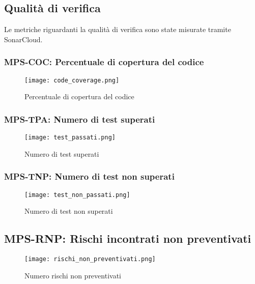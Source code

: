 \documentclass[../piano-di-qualifica.tex]{subfiles}
\begin{document}
\subsection{Qualità di verifica}%
\label{sub:qualita_verifica_report}
Le metriche riguardanti la qualità di verifica sono state misurate tramite SonarCloud.

\subsubsection{MPS-COC\@: Percentuale di copertura del codice}%
\label{subs:percentuale_cop_codice}
\begin{figure}[H]
  \centering
  \texttt{[image: code\_coverage.png]}%
  \caption{Percentuale di copertura del codice}%
  \label{fig:percentuale_cop_codice}%
\end{figure}

\subsubsection{MPS-TPA\@: Numero di test superati}%
\label{subs:test_non_superati}
\begin{figure}[H]
  \centering
  \texttt{[image: test\_passati.png]}%
  \caption{Numero di test superati}%
  \label{fig:test_non_superati}%
\end{figure}

\subsubsection{MPS-TNP\@: Numero di test non superati}%
\label{subs:test_superati}
\begin{figure}[H]
  \centering
  \texttt{[image: test\_non\_passati.png]}%
  \caption{Numero di test non superati}%
  \label{fig:test_superati}%
\end{figure}





\subsection{MPS-RNP\@: Rischi incontrati non preventivati}%
\label{sub:rischi_non_preventivati_report}

\begin{figure}[H]
  \centering
  \texttt{[image: rischi\_non\_preventivati.png]}%
  \caption{Numero rischi non preventivati}%
  \label{fig:rischi_non_preventivati}%
\end{figure}
\end{document}
